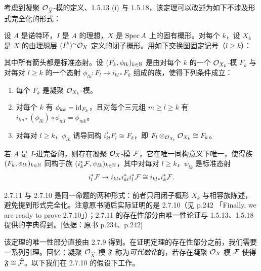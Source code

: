 考虑到凝聚 $\mathcal{O}_{\widehat{X}}$-模的定义、1.5.13 (i) 与 1.5.18，该定理可以改述为如下不涉及形式完全化的形式：

\begin{theorem}\label{it:2.7.11}
设 $A$ 是诺特环，$I$ 是 $A$ 的理想，$X$ 是 $\operatorname{Spec} A$ 上的固有概形。对每个 $k$，设 $X_k$ 是 $X$ 的由理想层 $(I^k)^{\sim}\mathcal{O}_X$ 定义的闭子概形。用如下交换图固定记号（$l\ge k$）：

\begin{center}
\end{center}

其中所有箭头都是标准态射。设 $(F_k,\phi_{lk})_{k\in\mathbb{N}}$ 是由对每个 $k$ 的一个 $\mathcal{O}_{X_k}$-模 $F_k$ 与对每对 $l\ge k$ 的一个态射 $\phi_{lk}\colon F_l\to i_{kl*}F_k$ 组成的族，使得下列条件成立：
\begin{enumerate}[label=(\alph*),leftmargin=2.8em]
\item 每个 $F_k$ 是凝聚 $\mathcal{O}_{X_k}$-模。
\item 对每个 $k$ 有 $\phi_{kk}=\operatorname{id}_{F_k}$，且对每个三元组 $m\ge l\ge k$ 有 $i_{lm*}(\phi_{lk})\circ\phi_{ml}=\phi_{mk}$。
\item 对每对 $l\ge k$，$\phi_{lk}$ 诱导同构 $i_{kl}^*F_l\cong F_k$，即 $F_l\otimes_{\mathcal{O}_{X_l}}\mathcal{O}_{X_k}\cong F_k$。
\end{enumerate}
若 $A$ 是 $I$-进完备的，则存在凝聚 $\mathcal{O}_X$-模 $\mathcal{F}$，它在唯一同构意义下唯一，使得族 $(F_k,\phi_{lk})_{k\in\mathbb{N}}$ 同构于族 $(i_k^*\mathcal{F},\psi_{lk})_{k\in\mathbb{N}}$，其中对每对 $l\ge k$，$\psi_{lk}$ 是标准态射
\begin{equation*}
i_l^*\mathcal{F}\to i_{kl*}i_{kl}^*i_l^*\mathcal{F}\cong i_{kl*}i_k^*\mathcal{F}.
\end{equation*}
\end{theorem}

\begin{tnote}
2.7.11 与 2.7.10 是同一命题的两种形式：前者只用闭子概形 $X_k$ 与相容族陈述，避免提到形式完全化。注意原书随后实际证明的是 2.7.10（见 p.242 「Finally, we are ready to prove 2.7.10」）；2.7.11 的存在性部分由唯一性论证与 1.5.13、1.5.18 提供的字典得到。[依据：原书 p.234、p.242]
\end{tnote}

该定理的唯一性部分直接由 2.7.9 得到。在证明定理的存在性部分之前，我们需要一系列引理。回忆：凝聚 $\mathcal{O}_{\widehat{X}}$-模 $\mathfrak{F}$ 称为\emph{可代数化}的，若存在凝聚 $\mathcal{O}_X$-模 $\mathcal{F}$ 使得 $\mathfrak{F}\cong\widehat{\mathcal{F}}$。以下我们在 2.7.10 的假设下工作。

